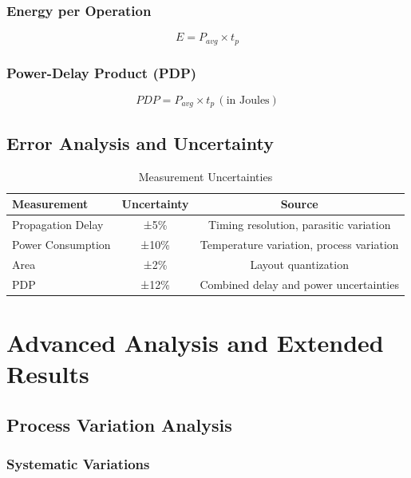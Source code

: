 \documentclass[12pt,a4paper,twoside]{report}
\begin{document}
\begin{appendices}
\subsection{Energy per Operation}

\begin{equation}
E = P_{avg} \times t_p
\end{equation}

\subsection{Power-Delay Product (PDP)}

\begin{equation}
PDP = P_{avg} \times t_p \, (\text{in Joules})
\end{equation}

\section{Error Analysis and Uncertainty}

\begin{table}[H]
\centering
\caption{Measurement Uncertainties}
\label{tab:uncertainties}
\begin{tabularx}{\textwidth}{lcc}
\toprule
Measurement & Uncertainty & Source \\
\midrule
Propagation Delay & ±5\% & Timing resolution, parasitic variation \\
Power Consumption & ±10\% & Temperature variation, process variation \\
Area & ±2\% & Layout quantization \\
PDP & ±12\% & Combined delay and power uncertainties \\
\bottomrule
\end{tabularx}
\end{table}

\chapter{Advanced Analysis and Extended Results}
\label{app:advanced_analysis}

\section{Process Variation Analysis}

\subsection{Systematic Variations}


\end{appendices}
\end{document}
